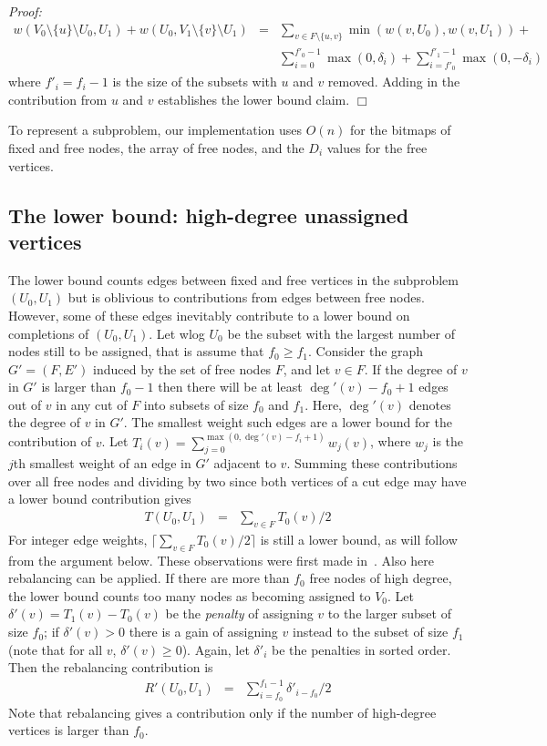 \documentclass[a4paper,11pt]{article}
\newcommand{\ceiling}[1]{\lceil #1\rceil}
\newenvironment{proof}{\emph{Proof:}}{$\Box$\newline}
\begin{document}
\begin{proof}
\begin{eqnarray*}
w(V_0\setminus\{u\}\setminus U_0,U_1)+w(U_0,V_1\setminus\{v\}\setminus
U_1) & = & \sum_{v\in F\setminus\{u,v\}}\min(w(v,U_0),w(v,U_1)) + \\
& & \sum_{i=0}^{f'_0-1}\max(0,\delta_i)+\sum_{i=f'_0}^{f'_1-1}\max(0,-\delta_i)
\end{eqnarray*}
where $f'_i=f_i-1$ is the size of the subsets with $u$ and $v$ removed.
Adding in the contribution from $u$ and $v$ establishes the lower
bound claim.
\end{proof}

To represent a subproblem, our implementation uses $O(n)$ for the
bitmaps of fixed and free nodes, the array of free nodes, and the
$D_i$ values for the free vertices.

\subsection{The lower bound: high-degree unassigned vertices}
\label{sec:highdegree}

The lower bound counts edges between fixed and free vertices in the
subproblem $(U_0,U_1)$ but is oblivious to contributions from edges
between free nodes. However, some of these edges inevitably contribute
to a lower bound on completions of $(U_0,U_1)$. Let wlog $U_0$ be the
subset with the largest number of nodes still to be assigned, that is
assume that $f_0\geq f_1$. Consider the graph $G'=(F,E')$ induced by
the set of free nodes $F$, and let $v\in F$. If the degree of $v$ in
$G'$ is larger than $f_0-1$ then there will be at least
$\deg'(v)-f_0+1$ edges out of $v$ in any cut of $F$ into subsets of
size $f_0$ and $f_1$. Here, $\deg'(v)$ denotes the degree of $v$ in
$G'$.  The smallest weight such edges are a lower bound for the
contribution of $v$. Let $T_i(v) =
\sum_{j=0}^{\max(0,\deg'(v)-f_i+1)}w_j(v)$, where $w_j$ is the $j$th
smallest weight of an edge in $G'$ adjacent to $v$. Summing these
contributions over all free nodes and dividing by two since both
vertices of a cut edge may have a lower bound contribution gives
\begin{eqnarray*}
T(U_0,U_1) & = & \sum_{v\in F}T_0(v)/2
\end{eqnarray*}
For integer edge weights, $\ceiling{\sum_{v\in F}T_0(v)/2}$ is still a
lower bound, as will follow from the argument below.  These
observations were first made in~\cite{Traff96:slb}. Also here
rebalancing can be applied. If there are more than $f_0$ free nodes of
high degree, the lower bound counts too many nodes as becoming
assigned to $V_0$. Let $\delta'(v) = T_1(v)-T_0(v)$ be the
\emph{penalty} of assigning $v$ to the larger subset of size $f_0$; if
$\delta'(v)>0$ there is a gain of assigning $v$ instead to the subset
of size $f_1$ (note that for all $v$, $\delta'(v)\geq 0$). Again, let
$\delta'_i$ be the penalties in sorted order. Then the rebalancing
contribution is
\begin{eqnarray*}
R'(U_0,U_1) & = & \sum_{i=f_0}^{f_1-1}\delta'_{i-f_0}/2
\end{eqnarray*}
Note that rebalancing gives a contribution only if the number of
high-degree vertices is larger than $f_0$.
\end{document}
